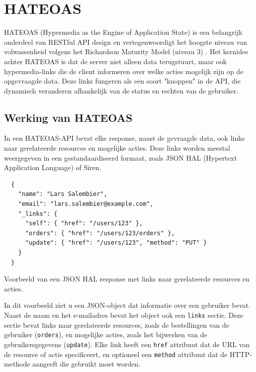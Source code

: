 \section{HATEOAS}

HATEOAS (Hypermedia as the Engine of Application State) is een belangrijk onderdeel van RESTful API design en vertegenwoordigt het hoogste niveau van volwassenheid volgens het Richardson Maturity Model (niveau 3) \autocite{Fowler2010}. Het kernidee achter HATEOAS is dat de server niet alleen data terugstuurt, maar ook hypermedia-links die de client informeren over welke acties mogelijk zijn op de opgevraagde data. Deze links fungeren als een soort "knoppen" in de API, die dynamisch veranderen afhankelijk van de status en rechten van de gebruiker.

\subsection{Werking van HATEOAS}

In een HATEOAS-API bevat elke response, naast de gevraagde data, ook links naar gerelateerde resources en mogelijke acties. Deze links worden meestal weergegeven in een gestandaardiseerd formaat, zoals JSON HAL (Hypertext Application Language) of Siren.

\begin{listing}[H]
  \begin{verbatim}
  {
    "name": "Lars Salembier",
    "email": "lars.salembier@example.com",
    "_links": {
      "self": { "href": "/users/123" },
      "orders": { "href": "/users/123/orders" },
      "update": { "href": "/users/123", "method": "PUT" }
    }
  }
  \end{verbatim}
  \caption[Voorbeeld van een JSON HAL response]{Voorbeeld van een JSON HAL response met links naar gerelateerde resources en acties.}
  \label{lst:json_hal_example}
\end{listing}

In dit voorbeeld ziet u een JSON-object dat informatie over een gebruiker bevat. Naast de naam en het e-mailadres bevat het object ook een \texttt{links} sectie. Deze sectie bevat links naar gerelateerde resources, zoals de bestellingen van de gebruiker (\texttt{orders}), en mogelijke acties, zoals het bijwerken van de gebruikersgegevens (\texttt{update}). Elke link heeft een \texttt{href} attribuut dat de URL van de resource of actie specificeert, en optioneel een \texttt{method} attribuut dat de HTTP-methode aangeeft die gebruikt moet worden.

